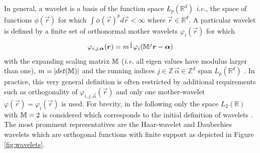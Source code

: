 In general, a wavelet is a basis of the function space $L_p(\mathbb{R}^d)$ \textit{i.e.}, the space of functions $\phi(\vec{r})$ for which $\int \phi(\vec{r})^p d\vec{r}<\infty$ where $\vec{r}\in\mathbb{R}^d$.
A particular wavelet is defined by a finite set of orthonormal mother wavelets $\varphi_i(\vec{r})$ for which
\begin{equation} \label{eq:waveBasis}
\varphi_{i,j,\bm{\alpha}}(\bm{r})=m^{\frac{j}{2}} \varphi_i(\mathbb{M}^j\bm{r}-\bm{\alpha})
\end{equation}
with the expanding scaling matrix $\mathbb{M}$ (\textit{i.e.} all eigen values have modulus larger than one), $m=|det(\mathbb{M})|$ and the running indices $j\in \mathbb{Z}\, \vec{\alpha}\in \mathbb{Z}^d$ span $L_p(\mathbb{R}^d)$ \cite{dahlke}.
In practice, this very general definition is often restricted by additional requirements such as orthogonality of $\varphi_{i,j,\vec{\alpha}}(\vec{r})$ and only one mother-wavelet $\varphi(\vec{r})=\varphi_i(\vec{r})$ is used.
For brevity, in the following only the space $L_2(\mathbb{R})$ with $\mathbb{M}=2$ is considered which corresponds to the initial definition of wavelets \cite{Tasche}.
The most prominent representatives are the Haar-wavelet and Daubechies wavelets which are orthogonal functions with finite support as depicted in Figure \ref{fig:wavelets}.

